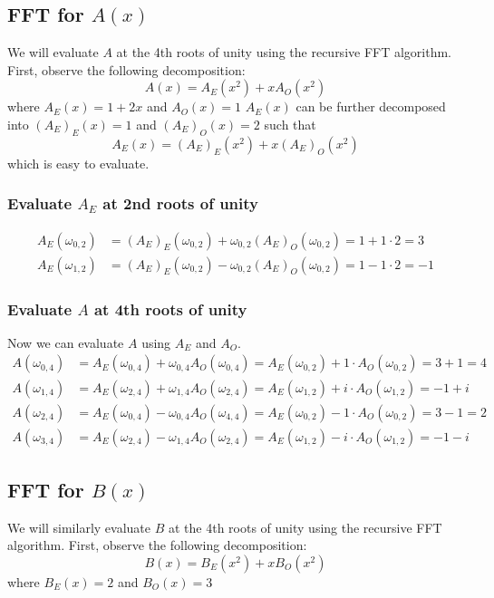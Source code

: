 \documentclass{article}
\begin{document}
\setcounter{section}{4}
\subsection{FFT for $A(x)$}
We will evaluate $A$ at the 4th roots of unity using the recursive FFT algorithm. First, observe the following decomposition:
$$A(x) = A_E(x^2)+xA_O(x^2)$$
where $A_E(x) = 1+2x$ and $A_O(x) = 1$
$A_E(x)$ can be further decomposed into $(A_E)_E(x)=1$ and $(A_E)_O(x) = 2$ such that
$$ A_E(x) = (A_E)_E(x^2)+x(A_E)_O(x^2)$$
which is easy to evaluate.
\subsubsection{Evaluate $A_E$ at 2nd roots of unity}

\begin{align*}
A_E(\omega_{0,2}) &= (A_E)_E(\omega_{0,2})+\omega_{0,2}(A_E)_O(\omega_{0,2})=1+1\cdot 2 =3 \\
A_E(\omega_{1,2}) &= (A_E)_E(\omega_{0,2})-\omega_{0,2}(A_E)_O(\omega_{0,2}) =1-1\cdot 2 = -1
\end{align*}


\subsubsection{Evaluate $A$ at 4th roots of unity}
Now we can evaluate $A$ using $A_E$ and $A_O$.
\begin{align*}
A(\omega_{0,4}) &= A_E(\omega_{0,4}) + \omega_{0,4}A_O(\omega_{0,4}) = A_E(\omega_{0,2}) + 1\cdot A_O(\omega_{0,2})=3+1 =4 \\
A(\omega_{1,4}) &= A_E(\omega_{2,4}) + \omega_{1,4}A_O(\omega_{2,4}) = A_E(\omega_{1,2}) + i\cdot A_O(\omega_{1,2}) =-1+i \\
A(\omega_{2,4}) &= A_E(\omega_{0,4}) - \omega_{0,4}A_O(\omega_{4,4}) =A_E(\omega_{0,2}) - 1\cdot A_O(\omega_{0,2}) =3-1 =2 \\
A(\omega_{3,4}) &= A_E(\omega_{2,4}) - \omega_{1,4}A_O(\omega_{2,4}) =A_E(\omega_{1,2}) - i\cdot A_O(\omega_{1,2}) =-1-i
\end{align*}


\subsection{FFT for $B(x)$}
We will similarly evaluate $B$ at the 4th roots of unity using the recursive FFT algorithm. First, observe the following decomposition:
$$B(x) = B_E(x^2)+xB_O(x^2)$$
where $B_E(x) = 2$ and $B_O(x) = 3$
\end{document}
